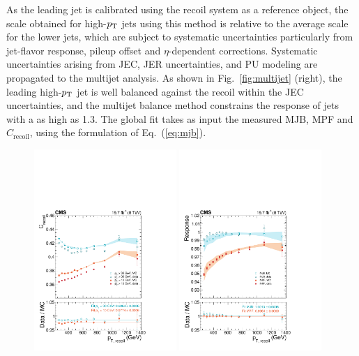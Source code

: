 \documentclass[11pt,twoside,a4paper,cmspaper,final,collab]{cms-tdr}
\begin{document}
As the leading jet is calibrated using the recoil system as a reference object, the scale obtained for high-$p_{\mathrm{T}}$ jets using this method is relative to the average scale for the lower \pt jets, which are subject to systematic uncertainties particularly from jet-flavor response, pileup offset and $\eta$-dependent corrections.  Systematic uncertainties arising from JEC, JER uncertainties, and PU modeling are propagated to the multijet analysis.
As shown in Fig.~\ref{fig:multijet} (right), the leading high-$p_{\mathrm{T}}$ jet is well balanced against the recoil within the JEC uncertainties, and the multijet balance method constrains the response of jets with a \pt as high as 1.3\TeV.
The global fit takes as input the measured MJB, MPF and $C_\mathrm{recoil}$, using the formulation of Eq.~(\ref{eq:mjb}).

\begin{figure}[htbp!]
\centering
\includegraphics[width=0.48\textwidth]{Figure_023-a.pdf}
\includegraphics[width=0.48\textwidth]{Figure_023-b.pdf}

\end{figure}
\end{document}
